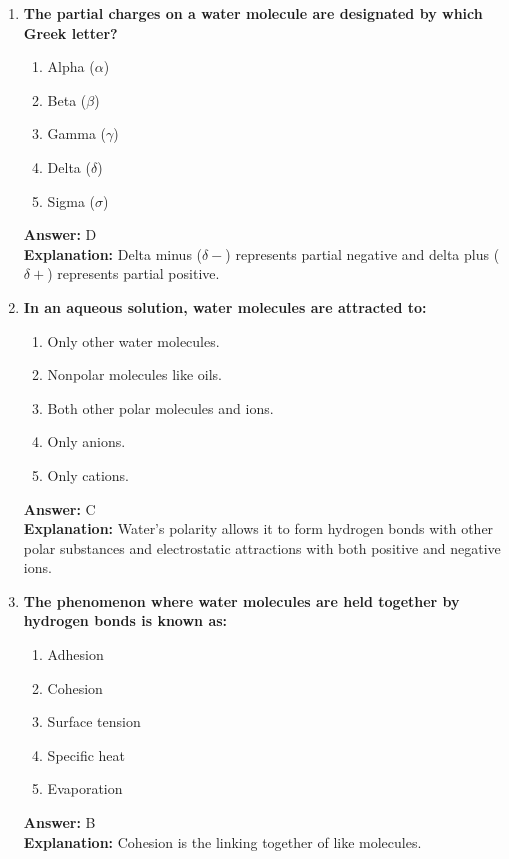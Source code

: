 \documentclass[11pt, a4paper]{article}
\begin{document}
\begin{enumerate}
\item \textbf{The partial charges on a water molecule are designated by which Greek letter?}
\begin{enumerate}[label=\Alph*.]
    \item Alpha ($\alpha$)
    \item Beta ($\beta$)
    \item Gamma ($\gamma$)
    \item Delta ($\delta$)
    \item Sigma ($\sigma$)
\end{enumerate}
\textbf{Answer:} D \\
\textbf{Explanation:} Delta minus ($\delta-$) represents partial negative and delta plus ($\delta+$) represents partial positive.

\item \textbf{In an aqueous solution, water molecules are attracted to:}
\begin{enumerate}[label=\Alph*.]
    \item Only other water molecules.
    \item Nonpolar molecules like oils.
    \item Both other polar molecules and ions.
    \item Only anions.
    \item Only cations.
\end{enumerate}
\textbf{Answer:} C \\
\textbf{Explanation:} Water's polarity allows it to form hydrogen bonds with other polar substances and electrostatic attractions with both positive and negative ions.


\item \textbf{The phenomenon where water molecules are held together by hydrogen bonds is known as:}
\begin{enumerate}[label=\Alph*.]
    \item Adhesion
    \item Cohesion
    \item Surface tension
    \item Specific heat
    \item Evaporation
\end{enumerate}
\textbf{Answer:} B \\
\textbf{Explanation:} Cohesion is the linking together of like molecules.


\end{enumerate}
\end{document}
